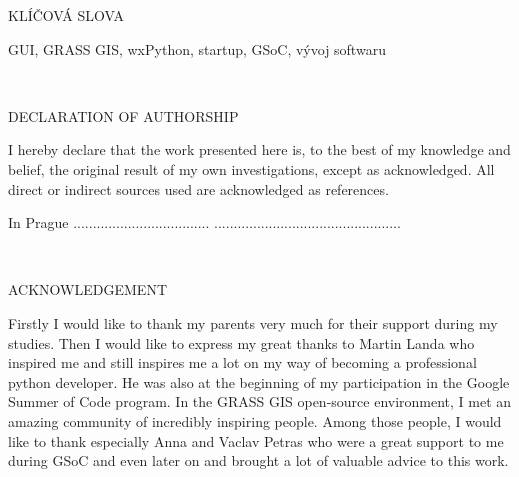 \documentclass[a4paper,10pt,twoside]{article}
\begin{document}
\vspace{2ex}
\begin{Large}
\noindent KLÍČOVÁ SLOVA
\end{Large}

\large
\noindent
\textrm{GUI, GRASS GIS, wxPython, startup, GSoC, vývoj softwaru}



\newpage ~ \newpage
\thispagestyle{empty}


\newpage
\mbox{}
\vfill
\begin{Large}
\noindent DECLARATION OF AUTHORSHIP
\end{Large}

I hereby declare that the work presented here is, to the best of my knowledge and belief, the original result of my own investigations, except as acknowledged.  All  direct  or  indirect  sources used are acknowledged as references.
\vspace{3ex}

\noindent In Prague ................................... \hfill ................................................


\newpage ~ \newpage
\thispagestyle{empty}



\newpage
\mbox{}
\vfill
\begin{Large}
\noindent ACKNOWLEDGEMENT
\end{Large}

Firstly I would like to thank my parents very much for their support during my studies. Then I would like to express my great thanks to Martin Landa who inspired me and still inspires me a lot on my way of becoming a professional python developer. He was also at the beginning of my participation in the Google Summer of Code program. In the GRASS GIS open-source environment, I met an amazing community of incredibly inspiring people. Among those people, I would like to thank especially Anna and Vaclav Petras who were a great support to me during GSoC and even later on and brought a lot of valuable advice to this work.


\newpage ~ \newpage
\thispagestyle{empty}


\newpage
\end{document}
